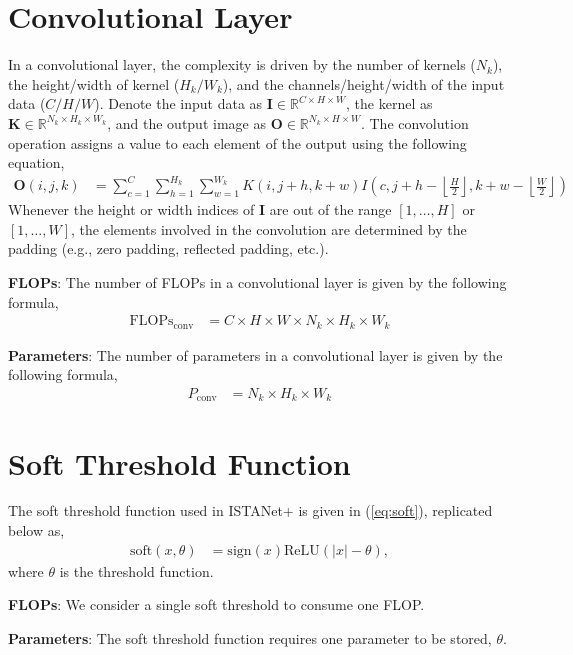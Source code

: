 \section{Convolutional Layer}

In a convolutional layer, the complexity is driven by the number of kernels ($N_k$), the height/width of kernel ($H_k/W_k$), and the channels/height/width of the input data ($C/H/W$). Denote the input data as $\mathbf I\in\mathbb{R}^{C\times H\times W}$, the kernel as $\mathbf{K}\in\mathbb{R}^{N_k\times H_k\times W_k}$, and the output image as $\mathbf O\in\mathbb{R}^{N_k\times H\times W}$. The convolution operation assigns a value to each element of the output using the following equation,
\begin{align}
	\mathbf{O}(i,j,k) &= \sum_{c=1}^{C}\sum_{h=1}^{H_k}\sum_{w=1}^{W_k} K(i,j+h,k+w)I\left(c,j+h-\left\lfloor\frac{H}{2}\right\rfloor,k+w-\left\lfloor\frac{W}{2}\right\rfloor\right)
\end{align}
Whenever the height or width indices of $\mathbf{I}$ are out of the range $[1,\dots,H]$ or $[1,\dots,W]$, the elements involved in the convolution are determined by the padding (e.g., zero padding, reflected padding, etc.).

\textbf{FLOPs}: The number of FLOPs in a convolutional layer is given by the following formula,
\begin{align*}
	\text{FLOPs}_{\text{conv}} &= C\times H \times W \times N_k \times H_k \times W_k
\end{align*}

\textbf{Parameters}: The number of parameters in a convolutional layer is given by the following formula,
\begin{align*}
	P_{\text{conv}} &= N_k\times H_k\times W_k
\end{align*}

\section{Soft Threshold Function}

The soft threshold function used in ISTANet+ \cite{ref:zhang2018ista} is given in (\ref{eq:soft}), replicated below as,
\begin{align*}
    \text{soft}(x, \theta) &= \text{sign}(x)\text{ReLU}(|x|-\theta),
\end{align*}
where $\theta$ is the threshold function.

\textbf{FLOPs}: We consider a single soft threshold to consume one FLOP.

\textbf{Parameters}: The soft threshold function requires one parameter to be stored, $\theta$.